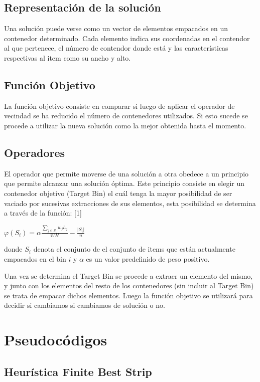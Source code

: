 \documentclass[a4paper,10pt]{article}
\begin{document}
\subsection{Representación de la solución}

Una solución puede verse como un vector de elementos empacados en un contenedor determinado. Cada elemento indica 
sus coordenadas en el contendor al que pertenece, el número de contendor donde está y las características respectivas al 
item como su ancho y alto. 

\subsection{Función Objetivo}
La función objetivo consiste en comparar si luego de aplicar el operador de vecindad se ha reducido el número de contenedores 
utilizados. Si esto sucede se procede a utilizar la nueva solución como la mejor obtenida hasta el momento.

\subsection{Operadores}
El operador que permite moverse de una solución a otra obedece a un principio que permite alcanzar una solución óptima. Este principio 
consiste en elegir un contenedor objetivo (Target Bin) el cuál tenga la mayor posibilidad de ser vaciado por sucesivas extracciones de 
sus elementos, esta posibilidad se determina a través de la función: [1]

\begin{center}
$\varphi(S_i) = \alpha \frac{\sum_{j \in S_i} {w_j h_j}}{W H} - \frac{|S_i|}{n}$
\end{center}

donde $S_i$ denota el conjunto de el conjunto de items que están actualmente empacados en el bin $i$ y $\alpha$ es un valor 
predefinido de peso positivo.

Una vez se determina el Target Bin se procede a extraer un elemento del mismo, y junto con los elementos del resto de los contenedores 
(sin incluir al Target Bin) se trata de empacar dichos elementos. Luego la función objetivo se utilizará para decidir si cambiamos 
si cambiamos de solución o no.

\section{Pseudocódigos}

\subsection{Heurística Finite Best Strip}
\end{document}

